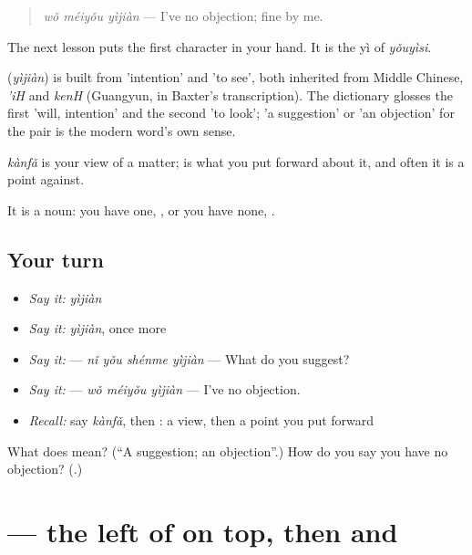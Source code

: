 \begin{quote}
\textbf{} \emph{wǒ méiyǒu yìjiàn} — I've no objection; fine by me.
\end{quote}

The next lesson puts the first character in your hand. It is the yì of \emph{yǒuyìsi}.

\begin{cousinweb}
\textbf{} (\emph{yìjiàn}) is built from  'intention' and  'to see', both inherited from Middle Chinese, \emph{'iH} and \emph{kenH} (Guangyun, in Baxter's transcription). The dictionary glosses the first 'will, intention' and the second 'to look'; 'a suggestion' or 'an objection' for the pair is the modern word's own sense.
\end{cousinweb}

\begin{grammarlens}[title={What you've built}]
\emph{kànfǎ} is your view of a matter;  is what you put forward about it, and often it is a point against.

It is a noun: you have one, , or you have none, .
\end{grammarlens}

\subsection*{Your turn}
\begin{itemize}
\raggedright
  \item \emph{Say it:} \emph{yìjiàn}
  \item \emph{Say it:} \emph{yìjiàn}, once more
  \item \emph{Say it:}  — \emph{nǐ yǒu shénme yìjiàn} — What do you suggest?
  \item \emph{Say it:}  — \emph{wǒ méiyǒu yìjiàn} — I've no objection.
  \item \emph{Recall:} say \emph{kànfǎ}, then : a view, then a point you put forward
\end{itemize}

\begin{tcolorbox}[breakable,colback=teal!4,colframe=teal!35!black,title={Before you move on}]
What does  mean? (\textquotedblleft{}A suggestion; an objection\textquotedblright{}.) How do you say you have no objection? (\textbf{}.)
\end{tcolorbox}
\section[\texorpdfstring{\zh{意} (yì)}{意 (yì)}]{ — the left of  on top, then  and }

